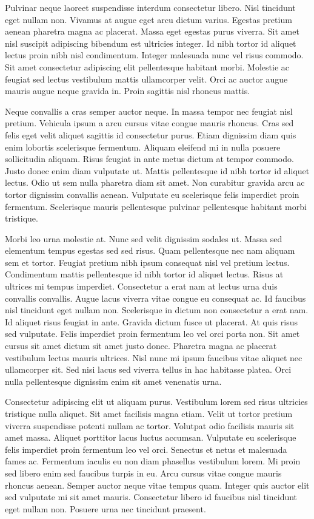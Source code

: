 Pulvinar neque laoreet suspendisse interdum consectetur libero. Nisl tincidunt eget nullam non. Vivamus at augue eget arcu dictum varius. Egestas pretium aenean pharetra magna ac placerat. Massa eget egestas purus viverra. Sit amet nisl suscipit adipiscing bibendum est ultricies integer. Id nibh tortor id aliquet lectus proin nibh nisl condimentum. Integer malesuada nunc vel risus commodo. Sit amet consectetur adipiscing elit pellentesque habitant morbi. Molestie ac feugiat sed lectus vestibulum mattis ullamcorper velit. Orci ac auctor augue mauris augue neque gravida in. Proin sagittis nisl rhoncus mattis.

Neque convallis a cras semper auctor neque. In massa tempor nec feugiat nisl pretium. Vehicula ipsum a arcu cursus vitae congue mauris rhoncus. Cras sed felis eget velit aliquet sagittis id consectetur purus. Etiam dignissim diam quis enim lobortis scelerisque fermentum. Aliquam eleifend mi in nulla posuere sollicitudin aliquam. Risus feugiat in ante metus dictum at tempor commodo. Justo donec enim diam vulputate ut. Mattis pellentesque id nibh tortor id aliquet lectus. Odio ut sem nulla pharetra diam sit amet. Non curabitur gravida arcu ac tortor dignissim convallis aenean. Vulputate eu scelerisque felis imperdiet proin fermentum. Scelerisque mauris pellentesque pulvinar pellentesque habitant morbi tristique.

Morbi leo urna molestie at. Nunc sed velit dignissim sodales ut. Massa sed elementum tempus egestas sed sed risus. Quam pellentesque nec nam aliquam sem et tortor. Feugiat pretium nibh ipsum consequat nisl vel pretium lectus. Condimentum mattis pellentesque id nibh tortor id aliquet lectus. Risus at ultrices mi tempus imperdiet. Consectetur a erat nam at lectus urna duis convallis convallis. Augue lacus viverra vitae congue eu consequat ac. Id faucibus nisl tincidunt eget nullam non. Scelerisque in dictum non consectetur a erat nam. Id aliquet risus feugiat in ante. Gravida dictum fusce ut placerat. At quis risus sed vulputate. Felis imperdiet proin fermentum leo vel orci porta non. Sit amet cursus sit amet dictum sit amet justo donec. Pharetra magna ac placerat vestibulum lectus mauris ultrices. Nisl nunc mi ipsum faucibus vitae aliquet nec ullamcorper sit. Sed nisi lacus sed viverra tellus in hac habitasse platea. Orci nulla pellentesque dignissim enim sit amet venenatis urna.

Consectetur adipiscing elit ut aliquam purus. Vestibulum lorem sed risus ultricies tristique nulla aliquet. Sit amet facilisis magna etiam. Velit ut tortor pretium viverra suspendisse potenti nullam ac tortor. Volutpat odio facilisis mauris sit amet massa. Aliquet porttitor lacus luctus accumsan. Vulputate eu scelerisque felis imperdiet proin fermentum leo vel orci. Senectus et netus et malesuada fames ac. Fermentum iaculis eu non diam phasellus vestibulum lorem. Mi proin sed libero enim sed faucibus turpis in eu. Arcu cursus vitae congue mauris rhoncus aenean. Semper auctor neque vitae tempus quam. Integer quis auctor elit sed vulputate mi sit amet mauris. Consectetur libero id faucibus nisl tincidunt eget nullam non. Posuere urna nec tincidunt praesent.

